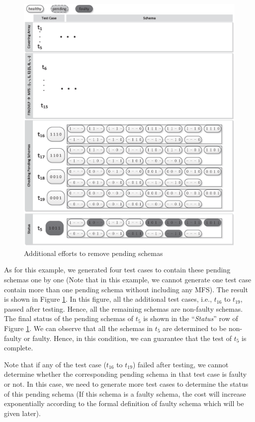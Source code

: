 \begin{figure}[!htb]
 \centering
 \includegraphics[width=5.3in]{non-pending.eps}
 \caption{Additional efforts to remove pending schemas}
 \label{fig_no_pending}
\end{figure}

As for this example, we generated four test cases to contain these pending schemas one by one (Note that in this example, we cannot generate one test case contain more than one pending schema without including any MFS). The result is shown in Figure \ref{fig_no_pending}. In this figure, all the additional test cases, i.e., $t_{16}$ to $t_{19}$, passed after testing. Hence, all the remaining schemas are non-faulty schemas. The final status of the pending schemas of $t_{5}$ is shown in the ``\emph{Status}'' row of Figure \ref{fig_no_pending}. We can observe that all the schemas in $t_{5}$ are determined to be non-faulty or faulty. Hence, in this condition, we can guarantee that the test of $t_{5}$ is complete.

Note that if any of the test case ($t_{16}$ to $t_{19}$) failed after testing, we cannot determine whether the corresponding pending schema in that test case is faulty or not.  In this case, we need to generate more test cases to determine the status of this pending schema (If this schema is a faulty schema, the cost will increase exponentially according to the formal definition of faulty schema which will be given later).

